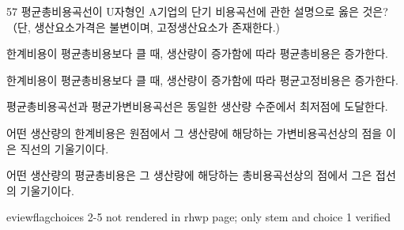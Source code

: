 \begin{question}{57}
평균총비용곡선이 U자형인 A기업의 단기 비용곡선에 관한 설명으로 옳은 것은?（단, 생산요소가격은 불변이며, 고정생산요소가 존재한다.)
\begin{choices}
  \item 한계비용이 평균총비용보다 클 때, 생산량이 증가함에 따라 평균총비용은 증가한다.
  \item 한계비용이 평균총비용보다 클 때, 생산량이 증가함에 따라 평균고정비용은 증가한다.
  \item 평균총비용곡선과 평균가변비용곡선은 동일한 생산량 수준에서 최저점에 도달한다.
  \item 어떤 생산량의 한계비용은 원점에서 그 생산량에 해당하는 가변비용곡선상의 점을 이은 직선의 기울기이다.
  \item 어떤 생산량의 평균총비용은 그 생산량에 해당하는 총비용곡선상의 점에서 그은 접선의 기울기이다.
\end{choices}

eviewflag{choices 2-5 not rendered in rhwp page; only stem and choice 1 verified}
\end{question}

